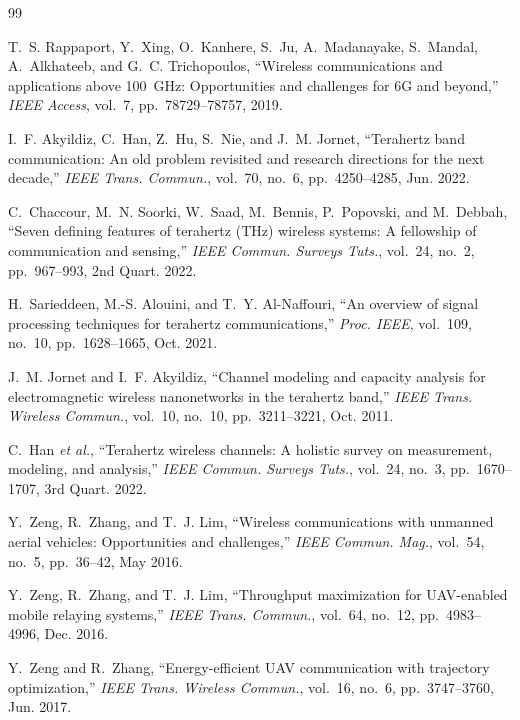 \documentclass[journal]{IEEEtran}
\begin{document}
\begin{thebibliography}{99}

T.~S. Rappaport, Y.~Xing, O.~Kanhere, S.~Ju, A.~Madanayake, S.~Mandal, A.~Alkhateeb, and G.~C. Trichopoulos, ``Wireless communications and applications above 100~GHz: Opportunities and challenges for 6G and beyond,'' \textit{IEEE Access}, vol.~7, pp.~78729--78757, 2019.

I.~F. Akyildiz, C.~Han, Z.~Hu, S.~Nie, and J.~M. Jornet, ``Terahertz band communication: An old problem revisited and research directions for the next decade,'' \textit{IEEE Trans. Commun.}, vol.~70, no.~6, pp.~4250--4285, Jun. 2022.

C.~Chaccour, M.~N. Soorki, W.~Saad, M.~Bennis, P.~Popovski, and M.~Debbah, ``Seven defining features of terahertz (THz) wireless systems: A fellowship of communication and sensing,'' \textit{IEEE Commun. Surveys Tuts.}, vol.~24, no.~2, pp.~967--993, 2nd Quart. 2022.

H.~Sarieddeen, M.-S. Alouini, and T.~Y. Al-Naffouri, ``An overview of signal processing techniques for terahertz communications,'' \textit{Proc. IEEE}, vol.~109, no.~10, pp.~1628--1665, Oct. 2021.

J.~M. Jornet and I.~F. Akyildiz, ``Channel modeling and capacity analysis for electromagnetic wireless nanonetworks in the terahertz band,'' \textit{IEEE Trans. Wireless Commun.}, vol.~10, no.~10, pp.~3211--3221, Oct. 2011.

C.~Han \textit{et al.}, ``Terahertz wireless channels: A holistic survey on measurement, modeling, and analysis,'' \textit{IEEE Commun. Surveys Tuts.}, vol.~24, no.~3, pp.~1670--1707, 3rd Quart. 2022.

Y.~Zeng, R.~Zhang, and T.~J. Lim, ``Wireless communications with unmanned aerial vehicles: Opportunities and challenges,'' \textit{IEEE Commun. Mag.}, vol.~54, no.~5, pp.~36--42, May 2016.

Y.~Zeng, R.~Zhang, and T.~J. Lim, ``Throughput maximization for UAV-enabled mobile relaying systems,'' \textit{IEEE Trans. Commun.}, vol.~64, no.~12, pp.~4983--4996, Dec. 2016.

Y.~Zeng and R.~Zhang, ``Energy-efficient UAV communication with trajectory optimization,'' \textit{IEEE Trans. Wireless Commun.}, vol.~16, no.~6, pp.~3747--3760, Jun. 2017.


\end{thebibliography}
\end{document}
